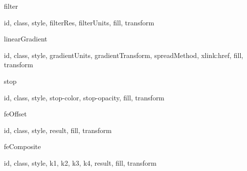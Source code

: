 \documentclass{article}
\begin{document}
\begin{Element}{filter}
    \begin{Optional}
        id, class, style, filterRes, filterUnits, fill, transform
    \end{Optional}
\end{Element}

\begin{Element}{linearGradient}
    \begin{Required}
    \end{Required}
    \begin{Optional}
        id, class, style, gradientUnits, gradientTransform, spreadMethod, xlink:href, fill, transform
    \end{Optional}
\end{Element}

\begin{Element}{stop}
    \begin{Required}
    \end{Required}
    \begin{Optional}
        id, class, style, stop-color, stop-opacity, fill, transform
    \end{Optional}
\end{Element}

\begin{Element}{feOffset}
    \begin{Required}
    \end{Required}
    \begin{Optional}
        id, class, style, result, fill, transform
    \end{Optional}
\end{Element}

\begin{Element}{feComposite}
    \begin{Required}
    \end{Required}
    \begin{Optional}
        id, class, style, k1, k2, k3, k4, result, fill, transform
    \end{Optional}
\end{Element}
\end{document}
